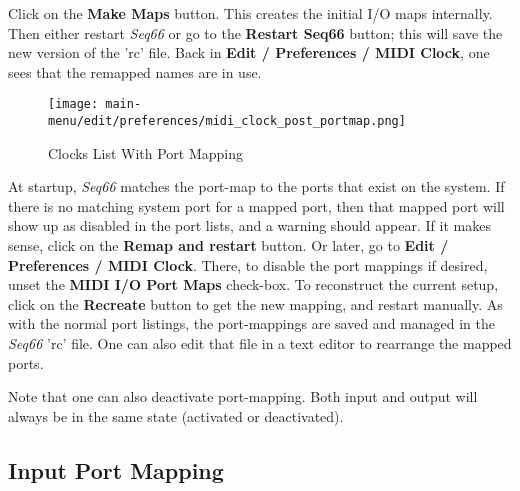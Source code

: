 \begin{comment}
\begin{figure}[H]
   \centering 
   \texttt{[image: main-menu/edit/preferences/midi\_clock\_pre\_portmap.png]}
   \caption{Clocks List Without Port Mapping}
   \label{fig:clocks_list_before_port_mapping}
\end{figure}

   Note the \texttt{system:midi\_playback} that is part of each port name.
   (There is a similar "capture" portion for input ports).
\end{comment}

   Click on the \textbf{Make Maps} button.
   This creates the initial I/O maps internally.
   Then either restart \textsl{Seq66} or go to the \textbf{Restart Seq66}
   button; this will save the new version of the 'rc' file.
   Back in \textbf{Edit / Preferences / MIDI Clock},
   one sees that the remapped names are in use.

\begin{figure}[H]
   \centering 
   \texttt{[image: main-menu/edit/preferences/midi\_clock\_post\_portmap.png]}
   \caption{Clocks List With Port Mapping}
   \label{fig:clocks_list_with_port_mapping}
\end{figure}


   At startup, \textsl{Seq66} matches the port-map to the ports that exist on
   the system.  If there is no matching system port for a mapped port, then
   that mapped port will show up as disabled in the port lists,
   and a warning should appear.
   If it makes sense, click on the \textbf{Remap and restart} button.
   Or later, go to \textbf{Edit / Preferences / MIDI Clock}.
   There, to disable the port mappings if desired, unset the
   \textbf{MIDI I/O Port Maps} check-box.
   To reconstruct the current setup, click on the \textbf{Recreate} button to
   get the new mapping, and restart manually.
   As with the normal port listings, the port-mappings are saved and
   managed in the \textsl{Seq66} 'rc' file.
   One can also edit that file in a text editor to
   rearrange the mapped ports.

   Note that one can also deactivate port-mapping. Both input and output
   will always be in the same state (activated or deactivated).

\subsection{Input Port Mapping}
\label{subsec:input_port_mapping}

